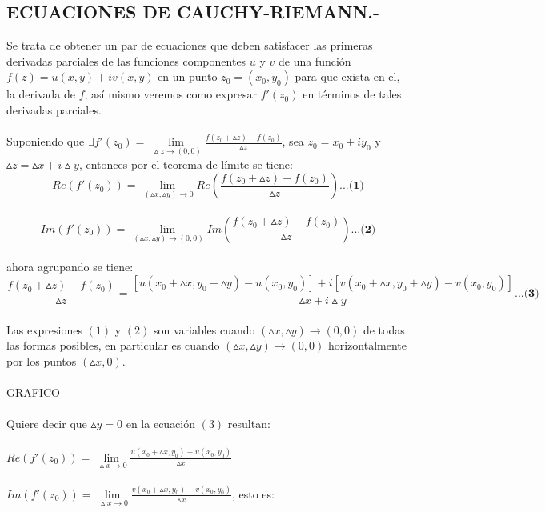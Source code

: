 \documentclass[10pt,a4paper]{book}
\begin{document}
\subsection{ECUACIONES DE CAUCHY-RIEMANN.-}
Se trata de obtener un par de ecuaciones que deben satisfacer las primeras derivadas parciales de las funciones componentes $u$ y $v$ de una función $f(z)=u(x,y)+iv(x,y)$ en un punto $z_0=(x_0,y_0)$ para que exista en el, la derivada de $f$, así mismo veremos como expresar $f'(z_0)$ en términos de tales derivadas parciales.
\\
\\
Suponiendo que $\exists f'(z_0)=\lim\limits_{\ \vartriangle z \rightarrow (0,0)}\frac{f(z_0+\vartriangle z)-f(z_0)}{\vartriangle z}$, sea $z_0=x_0+iy_0$ y $\vartriangle z=\vartriangle x+i\vartriangle y$, entonces por el teorema de límite se tiene:
\\
$$Re(f'(z_0))=\lim\limits_{\ (\vartriangle x,\vartriangle y) \rightarrow 0}Re(\frac{f(z_0+\vartriangle z)-f(z_0)}{\vartriangle z}) \textbf{...(1)}$$ 
\\
$$Im(f'(z_0))=\lim\limits_{\ (\vartriangle x,\vartriangle y) \rightarrow (0,0)}Im(\frac{f(z_0+\vartriangle z)-f(z_0)}{\vartriangle z}) \textbf{...(2})$$ 
\\
ahora agrupando se tiene:
\\
$$\frac{f(z_0+\vartriangle z)-f(z_0)}{\vartriangle z}=\frac{[u(x_0+\vartriangle x,y_0+\vartriangle y)-u(x_0,y_0)]+i[v(x_0+\vartriangle x,y_0+\vartriangle y)-v(x_0,y_0)]}{\vartriangle x+i\vartriangle y} \textbf{...(3)}$$
\\
Las expresiones $(1)$ y $(2)$ son variables cuando $(\vartriangle x,\vartriangle y) \longrightarrow (0,0)$ de todas las formas posibles, en particular es cuando $(\vartriangle x,\vartriangle y) \longrightarrow (0,0)$ horizontalmente por los puntos $(\vartriangle x,0)$.
\\
\\
GRAFICO
\\
\\
Quiere decir que $\vartriangle y=0$ en la ecuación $(3)$ resultan:
\\
\\
$Re(f'(z_0))=\lim\limits_{\ \vartriangle x \rightarrow 0}\frac{u(x_0+\vartriangle x,y_0)-u(x_0,y_0)}{\vartriangle x}$
\\
\\
$Im(f'(z_0))=\lim\limits_{\ \vartriangle x \rightarrow 0}\frac{v(x_0+\vartriangle x,y_0)-v(x_0,y_0)}{\vartriangle x}$, esto es:
\\
\end{document}
